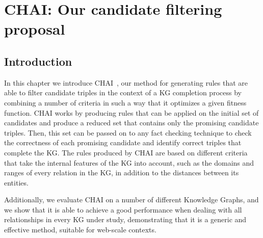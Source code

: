 \chapter{CHAI: Our candidate filtering proposal}\label{chap:chai}



\section{Introduction}\label{sec:chai-intro}
In this chapter we introduce CHAI~\cite{borrego2019}, our method for generating rules that are able to filter candidate triples in the context of a KG completion process by combining a number of criteria in such a way that it optimizes a given fitness function. CHAI works by producing rules that can be applied on the initial set of candidates and produce a reduced set that contains only the promising candidate triples. Then, this set can be passed on to any fact checking technique to check the correctness of each promising candidate and identify correct triples that complete the KG. The rules produced by CHAI are based on different criteria that take the internal features of the KG into account, such as the domains and ranges of every relation in the KG, in addition to the distances between its entities.

Additionally, we evaluate CHAI on a number of different Knowledge Graphs, and we show that it is able to achieve a good performance when dealing with all relationships in every KG under study, demonstrating that it is a generic and effective method, suitable for web-scale contexts.

